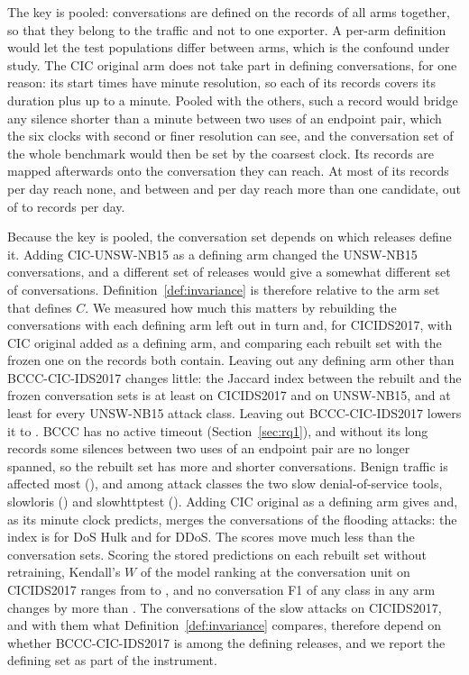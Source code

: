 \documentclass[pdflatex,sn-mathphys-num]{sn-jnl}
\newcommand{\cicids}{CICIDS2017}
\theoremstyle{thmstyleone}%
\theoremstyle{thmstylethree}%
\begin{document}
The key is pooled: conversations are defined on the records of all arms together, so that they belong to the traffic and not to one exporter. A per-arm definition would let the test populations differ between arms, which is the confound under study. The CIC original arm does not take part in defining conversations, for one reason: its start times have minute resolution, so each of its records covers its duration plus up to a minute. Pooled with the others, such a record would bridge any silence shorter than a minute between two uses of an endpoint pair, which the six clocks with second or finer resolution can see, and the conversation set of the whole benchmark would then be set by the coarsest clock. Its records are mapped afterwards onto the conversation they can reach. At most \NnondefUnmappedMax{} of its records per day reach none, and between \NnondefAmbigMin{} and \NnondefAmbigMax{} per day reach more than one candidate, out of \NcicDayRecordsMin{} to \NcicDayRecordsMax{} records per day.

Because the key is pooled, the conversation set depends on which releases define it. Adding CIC-UNSW-NB15 as a defining arm changed the UNSW-NB15 conversations, and a different set of releases would give a somewhat different set of conversations. Definition~\ref{def:invariance} is therefore relative to the arm set that defines $C$. We measured how much this matters by rebuilding the conversations with each defining arm left out in turn and, for \cicids{}, with CIC original added as a defining arm, and comparing each rebuilt set with the frozen one on the records both contain. Leaving out any defining arm other than BCCC-CIC-IDS2017 changes little: the Jaccard index between the rebuilt and the frozen conversation sets is at least \RevLooJaccOtherMinCic{} on \cicids{} and \RevLooJaccMinUnsw{} on UNSW-NB15, and at least \RevLooAttackMinUnsw{} for every UNSW-NB15 attack class. Leaving out BCCC-CIC-IDS2017 lowers it to \RevLooJaccMinCic{}. BCCC has no active timeout (Section~\ref{sec:rq1}), and without its long records some silences between two uses of an endpoint pair are no longer spanned, so the rebuilt set has more and shorter conversations. Benign traffic is affected most (\RevLooBenignDropBccc{}), and among attack classes the two slow denial-of-service tools, slowloris (\RevLooSlowlorisDropBccc{}) and slowhttptest (\RevLooSlowhttpDropBccc{}). Adding CIC original as a defining arm gives \RevLooJaccPlusOrig{} and, as its minute clock predicts, merges the conversations of the flooding attacks: the index is \RevLooHulkPlusOrig{} for DoS Hulk and \RevLooDdosPlusOrig{} for DDoS. The scores move much less than the conversation sets. Scoring the stored predictions on each rebuilt set without retraining, Kendall's $W$ of the model ranking at the conversation unit on \cicids{} ranges from \RevLooWMinCic{} to \RevLooWMaxCic{}, and no conversation F1 of any class in any arm changes by more than \RevLooFoneMaxChange{}. The conversations of the slow attacks on \cicids{}, and with them what Definition~\ref{def:invariance} compares, therefore depend on whether BCCC-CIC-IDS2017 is among the defining releases, and we report the defining set as part of the instrument.
\end{document}

